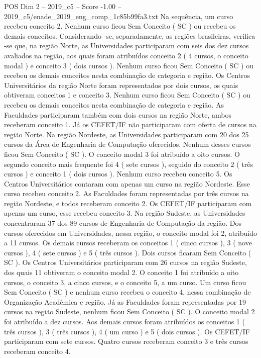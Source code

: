 \begin{textsample}{POS Dim 2 – 2019\_c5 – Score -1.00 – 2019\_c5/enade\_2019\_eng\_comp\_1c85b99fa3.txt}
Na sequência, um curso recebeu conceito 2.
Nenhum curso ficou Sem Conceito ( SC ) ou recebeu os demais conceitos.
Considerando -se, separadamente, as regiões brasileiras, verifica -se que, na região Norte, as Universidades participaram com seis dos dez cursos avaliados na região, aos quais foram atribuídos conceito 2 ( 4 cursos, o conceito modal ) e conceito 3 ( dois cursos ).
Nenhum curso ficou Sem Conceito ( SC ) ou recebeu os demais conceitos nesta combinação de categoria e região.
Os Centros Universitários da região Norte foram representados por dois cursos, os quais obtiveram conceitos 1 e conceito 3.
Nenhum curso ficou Sem Conceito ( SC ) ou recebeu os demais conceitos nesta combinação de categoria e região.
As Faculdades participaram também com dois cursos na região Norte, ambos receberam conceito 1.
Já os CEFET/IF não participaram com oferta de cursos na região Norte.
Na região Nordeste, as Universidades participaram com 20 dos 25 cursos da Área de Engenharia de Computação oferecidos.
Nenhum desses cursos ficou Sem Conceito ( SC ).
O conceito modal 3 foi atribuído a oito cursos.
O segundo conceito mais frequente foi 4 ( sete cursos ), seguido do conceito 2 ( três cursos ) e conceito 1 ( dois cursos ).
Nenhum curso recebeu conceito 5.
Os Centros Universitários contaram com apenas um curso na região Nordeste.
Esse curso recebeu conceito 2.
As Faculdades foram representadas por três cursos na região Nordeste, e todos receberam conceito 2.
Os CEFET/IF participaram com apenas um curso, esse recebeu conceito 3.
Na região Sudeste, as Universidades concentraram 37 dos 89 cursos de Engenharia de Computação da região.
Dos cursos oferecidos em Universidades, nessa região, o conceito modal foi 2, atribuído a 11 cursos.
Os demais cursos receberam os conceitos 1 ( cinco cursos ), 3 ( nove cursos ), 4 ( sete cursos ) e 5 ( três cursos ).
Dois cursos ficaram Sem Conceito ( SC ).
Os Centros Universitários participaram com 26 cursos na região Sudeste, dos quais 11 obtiveram o conceito modal 2.
O conceito 1 foi atribuído a oito cursos, o conceito 3, a cinco cursos, e o conceito 5, a um curso.
Um curso ficou Sem Conceito ( SC ) e nenhum curso recebeu o conceito 4, nessa combinação de Organização Acadêmica e região.
Já as Faculdades foram representadas por 19 cursos na região Sudeste, nenhum ficou Sem Conceito ( SC ).
O conceito modal 2 foi atribuído a dez cursos.
Aos demais cursos foram atribuídos os conceitos 1 ( três cursos ), 3 ( três cursos ), 4 ( um curso ) e 5 ( dois cursos ).
Os CEFET/IF participaram com sete cursos.
Quatro cursos receberam conceito 3 e três cursos receberam conceito 4.

\end{textsample}
